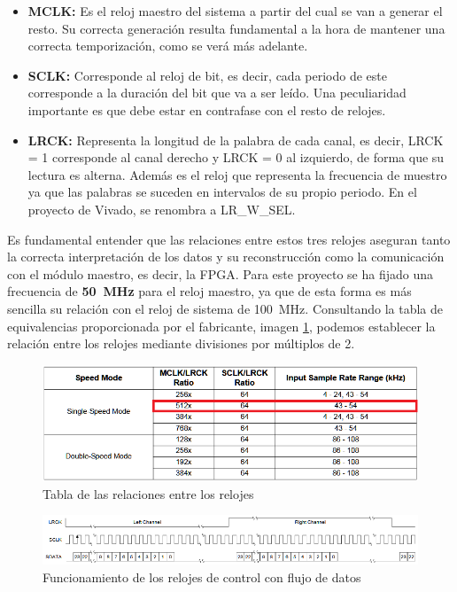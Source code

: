 \begin{itemize}
\item \textbf{MCLK:} Es el reloj maestro del sistema a partir del cual se van a generar el resto. Su correcta generación resulta fundamental a la hora de mantener una correcta temporización, como se verá más adelante.
\item \textbf{SCLK:} Corresponde al reloj de bit, es decir, cada periodo de este corresponde a la duración del bit que va a ser leído. Una peculiaridad importante es que debe estar en contrafase con el resto de relojes.
\item \textbf{LRCK:} Representa la longitud de la palabra de cada canal, es decir, LRCK = 1 corresponde al canal derecho y LRCK = 0 al izquierdo, de forma que su lectura es alterna. Además es el reloj que representa la frecuencia de muestro ya que las palabras se suceden en intervalos de su propio periodo. En el proyecto de Vivado, se renombra a LR\_W\_SEL.
\end{itemize}


Es fundamental entender que las relaciones entre estos tres relojes aseguran tanto la correcta interpretación de los datos y su reconstrucción como la comunicación con el módulo maestro, es decir, la FPGA. Para este proyecto se ha fijado una frecuencia de \textbf{50~MHz} para el reloj maestro, ya que de esta forma es más sencilla su relación con el reloj de sistema de 100~MHz. Consultando la tabla de equivalencias proporcionada por el fabricante, imagen \ref{fig:flujoreloj}, podemos establecer la relación entre los relojes mediante divisiones por múltiplos de 2.

\begin{figure}[!b]
\begin{center}
\includegraphics[width=15cm]{img/ratiosreloj.png}
\caption{\label{fig:flujoreloj}Tabla de las relaciones entre los relojes}
\end{center}
\end{figure}

\begin{figure}[!b]
\begin{center}
\includegraphics[width=14cm]{img/i2sov.png}
\caption{\label{fig:i2sov}Funcionamiento de los relojes de control con flujo de datos}
\end{center}
\end{figure}

